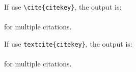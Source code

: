 \documentclass{article}
\begin{document}
If use \verb!\cite{citekey}!, the output is:\\ 
\cite{massa2022daplacer} \\
\cite{massa2022daplacer, massa2022daplacer} for multiple citations.

\vspace{1cm}

If use \verb!textcite{citekey}!, the output is:\\
\textcite{massa2022daplacer} \\
\textcite{massa2022daplacer,forti2022fogbrain} for multiple citations.

\AtNextBibliography{\footnotesize} %
\printbibliography[heading=bibintoc]
\end{document}
